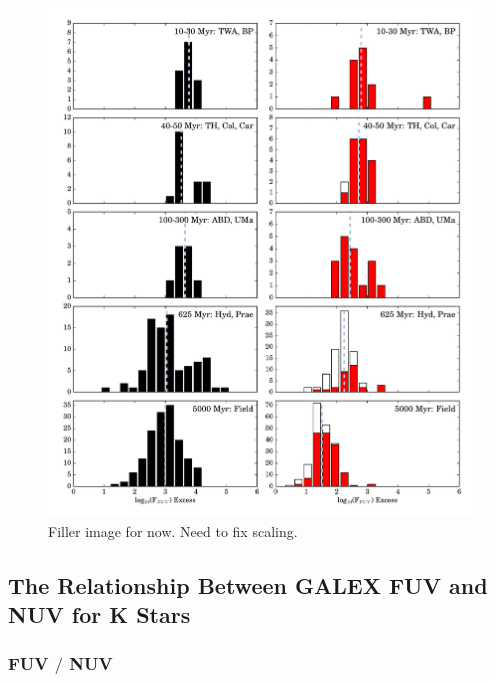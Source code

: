 \documentclass[twocolumn]{aastex62}
\begin{document}
\begin{figure}[t]
\centering
\includegraphics[width=\linewidth]{histfd_NO_J.pdf}
\caption{Filler image for now. Need to fix scaling. \label{fig:histfd}}
\end{figure}


\subsection{The Relationship Between GALEX FUV and NUV for K Stars}
\subsubsection{FUV $/$ NUV}
\end{document}
